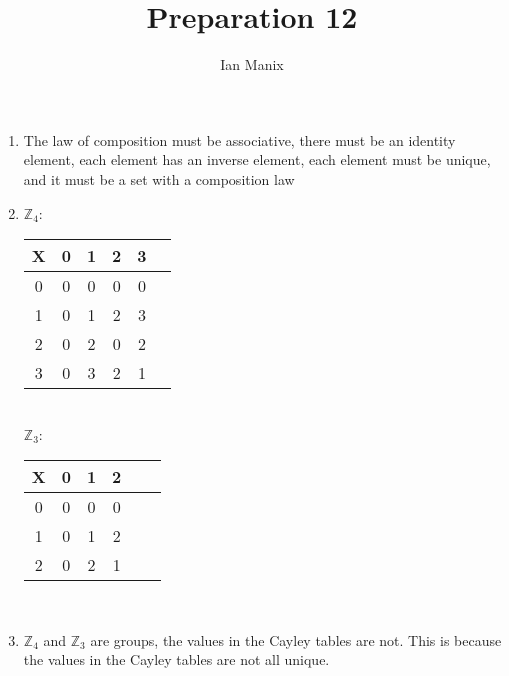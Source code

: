 \documentclass[sigconf]{article}
\title{
  \textbf{Preparation 12} \\
  }
\author{ 
  Ian Manix
  }
\begin{document}



\maketitle





\begin{enumerate}
  \item The law of composition must be associative, there must be an identity element, each element has an inverse element, each element must be unique, and it must be a set with a composition law
  \item $\mathbb{Z}_4$: \\
    \setlength\extrarowheight{3pt}
    \begin{tabular}{c | c c c c c}
      X & 0 & 1 & 2 & 3  \\
      \hline
      0 & 0 & 0 & 0 & 0 \\
      1 & 0 & 1 & 2 & 3 \\
      2 & 0 & 2 & 0 & 2 \\
      3 & 0 & 3 & 2 & 1 \\
    \end{tabular}\\
    $\mathbb{Z}_3$: \\
    \setlength\extrarowheight{3pt}
    \begin{tabular}{c | c c c c c}
      X & 0 & 1 & 2  \\
      \hline
      0 & 0 & 0 & 0 \\
      1 & 0 & 1 & 2 \\
      2 & 0 & 2 & 1 \\
    \end{tabular}\\
  \item $\mathbb{Z}_4$ and $\mathbb{Z}_3$ are groups, the values in the Cayley tables are not. This is because the values in the Cayley tables are not all unique.
\end{enumerate}



\end{document}
